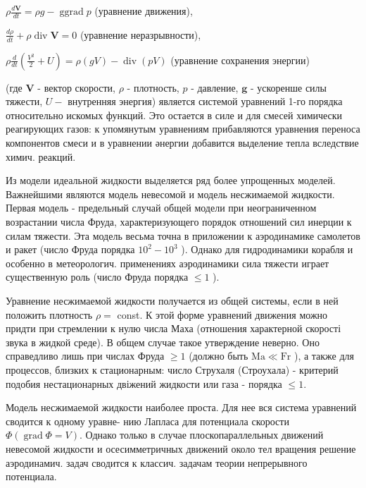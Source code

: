 \documentclass[10pt]{article}
\begin{document}
$\rho \frac{d \boldsymbol{V}}{d t}=\rho g-\operatorname{ggrad} p$ (уравнение движения),



$\frac{d \rho}{d t}+\rho \operatorname{div} \boldsymbol{V}=0$ (уравнение неразрывности),



$\rho \frac{d}{d t}\left(\frac{V^{2}}{2}+U\right)=\rho(g V)-\operatorname{div}(p V)$ (уравнение сохранения энергии)



(где $\boldsymbol{V}$ - вектор скорости, $\rho$ - плотность, $p$ - давление, $\boldsymbol{g}$ - ускоренше силы тяжести, $U-$ внутренняя энергия) является системой уравнений 1-го порядка относительно искомых функций. Это остается в силе и для смесей химически реагирующих газов: к упомянутым уравнениям прибавляются уравнения переноса компонентов смеси и в уравнении әнергии добавится выделение тепла вследствие химич. реакций.



Из модели идеальной жидкости выделяется ряд более упрощенных моделей. Важнейшими являются модель невесомой и модель несжимаемой жидкости. Первая модель - предельный случай общей модели при неограниченном возрастании числа Фруда, характеризующего порядок отношений сил инерции к силам тяжести. Эта модель весьма точна в приложении к аэродинамике самолетов и ракет (число Фруда порядка $10^{2}-10^{3}$ ). Однако для гидродинамики корабля и особенно в метеорологич. применениях аэродинамики сила тяжести играет существенную роль (число Фруда порядка $\leqslant 1$ ).



Уравнение несжимаемой жидкости получается из общей системы, если в ней положить плотность $\rho=$ const. К этой форме уравнений движения можно придти при стремлении к нулю числа Маха (отношения характерной скорості звука в жидкой среде). В общем случае такое утверждение неверно. Оно справедливо лишь при числах Фруда $\geqslant 1$ (должно быть $\mathrm{Ma} \ll \mathrm{Fr}$ ), а также для процессов, близких к стационарным: число Струхаля (Строухала) - критерий подобия нестационарных двіжений жидкости или газа - порядка $\leqslant 1$.



Модель несжимаемой жидкости наиболее проста. Для нее вся система уравнений сводится к одному уравне- нию Лапласа для потенциала скорости $\Phi(\operatorname{grad} \Phi=V)$. Однако только в случае плоскопараллельных движений невесомой жидкости и осесимметричных движений около тел вращения решение аэродинамич. задач сводится к классич. задачам теории непрерывного потенциала.
\end{document}
